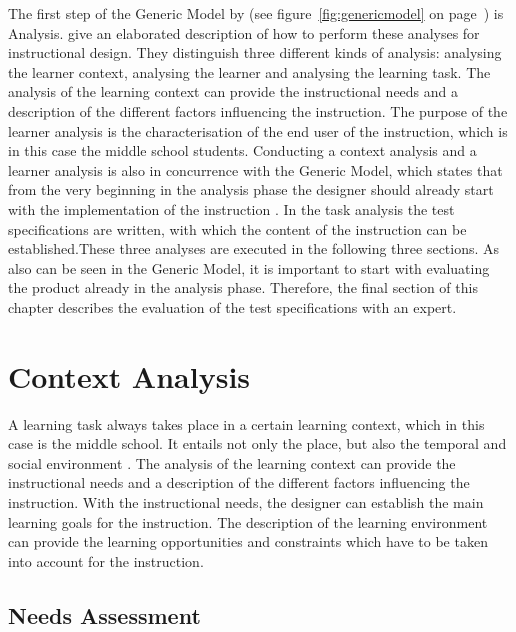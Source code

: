 \documentclass[11pt,twoside]{report} %
\begin{document}
The first step of the Generic Model by  (see figure~\ref{fig:genericmodel} on page~\pageref{fig:genericmodel}) is Analysis.  give an elaborated description of how to perform these analyses for instructional design. They distinguish three different kinds of analysis: analysing the learner context, analysing the learner and analysing the learning task. The analysis of the learning context can provide the instructional needs and a description of the different factors influencing the instruction. The purpose of the learner analysis is the characterisation of the end user of the instruction, which is in this case the middle school students. Conducting a context analysis and a learner analysis is also in concurrence with the Generic Model, which states that from the very beginning in the analysis phase the designer should already start with the implementation of the instruction \cite{genericmodel}. In the task analysis the test specifications are written, with which the content of the instruction can be established.These three analyses are executed in the following three sections. As also can be seen in the Generic Model, it is important to start with evaluating the product already in the analysis phase. Therefore, the final section of this chapter describes the evaluation of the test specifications with an expert.


\section{Context Analysis}

A learning task always takes place in a certain learning context, which in this case is the middle school. It entails not only the place, but also the temporal and social environment \cite{smithragan}. The analysis of the learning context can provide the instructional needs and a description of the different factors influencing the instruction. With the instructional needs, the designer can establish the main learning goals for the instruction. The description of the learning environment can provide the learning opportunities and constraints which have to be taken into account for the instruction.


\subsection{Needs Assessment}
\end{document}
